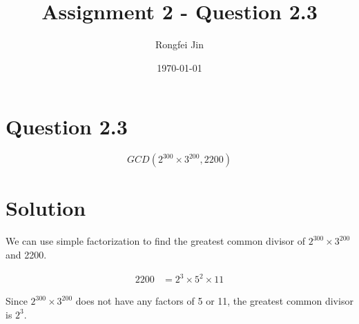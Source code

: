 \documentclass{article}
\author{Rongfei Jin}
\title{Assignment 2 - Question 2.3}
\date{\today}
\begin{document}
\section{Question 2.3}
$$
GCD(2^{300}\times 3^{200}, 2200)
$$

\section{Solution}
We can use simple factorization to find the greatest common divisor of $2^{300}\times 3^{200}$ and 2200.

\begin{align*}
    2200 &= 2^3 \times 5^2 \times 11
\end{align*}

Since $2^{300}\times 3^{200}$ does not have any factors of 5 or 11, the greatest common divisor is $2^{3}$.
\end{document}

